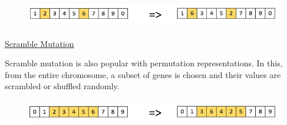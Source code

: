 \documentclass[12pt]{article}
\renewcommand{\_}{\kern-1.5pt\textunderscore\kern-1.5pt}
\begin{document}

\begin{figure}[H]
	\begin{Center}
		\includegraphics[width=6.25in,height=0.47in]{./media/image18.png}
	\end{Center}
\end{figure}



\setlength{\parskip}{8.04pt}
\par


\vspace{\baselineskip}
\setlength{\parskip}{7.2pt}
\begin{adjustwidth}{0.03in}{0.03in}
{\fontsize{14pt}{16.8pt}\selectfont \uline{Scramble Mutation}\par}\par

\end{adjustwidth}

\begin{adjustwidth}{0.03in}{0.03in}
{\fontsize{11pt}{13.2pt}\selectfont Scramble mutation is also popular with permutation representations. In this, from the entire chromosome, a subset of genes is chosen and their values are scrambled or shuffled randomly.\par}\par

\end{adjustwidth}




\begin{figure}[H]
	\begin{Center}
		\includegraphics[width=6.25in,height=0.42in]{./media/image19.png}
	\end{Center}
\end{figure}


\end{document}
